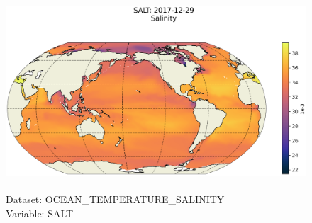 \begin{figure}[H]
\centering
\includegraphics[scale=0.5]{../images/plots/latlon_plots/Ocean_Temperature_and_Salinity/SALT.png}
\caption{\\Dataset: OCEAN\_TEMPERATURE\_SALINITY\\Variable: SALT}
\label{tab:table-OCEAN_TEMPERATURE_SALINITY_SALT-Plot}
\end{figure}
\pagebreak
